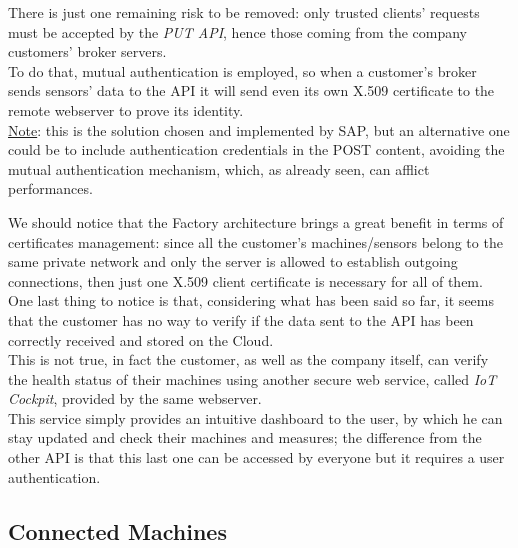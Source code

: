 \documentclass[12pt]{report}
\begin{document}
{{There is just one remaining risk to be removed: only trusted clients' requests must be accepted by the \emph{PUT API}, hence those coming from the company customers' broker servers.\\
To do that, mutual authentication is employed, so when a customer's broker sends sensors' data to the API it will send even its own X.509 certificate to the remote webserver to prove its identity.\\
\underline{Note}: this is the solution chosen and implemented by SAP, but an alternative one could be to include authentication credentials in the POST content, avoiding the mutual authentication mechanism, which, as already seen, can afflict performances.

We should notice that the Factory architecture brings a great benefit in terms of certificates management: since all the customer's machines/sensors belong to the same private network and only the server is allowed to establish outgoing connections, then just one X.509 client certificate is necessary for all of them.\\

One last thing to notice is that, considering what has been said so far, it seems that the customer has no way to verify if the data sent to the API has been correctly received and stored on the Cloud.\\
This is not true, in fact the customer, as well as the company itself, can verify the health status of their machines using another secure web service, called \emph{IoT Cockpit}, provided by the same webserver.\\
This service simply provides an intuitive dashboard to the user, by which he can stay updated and check their machines and measures; the difference from the other API is that this last one can be accessed by everyone but it requires a user authentication.\\


\subsection{Connected Machines}

}}
\end{document}
